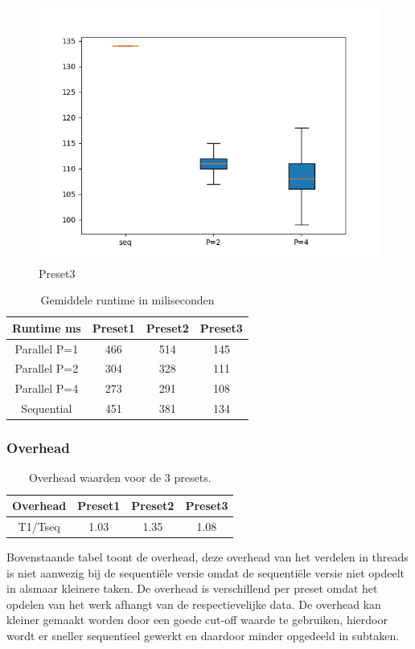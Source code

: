 \documentclass[]{article}
\begin{document}
\begin{figure}
	\centering
	\includegraphics[width=0.7\linewidth]{Preset_3}
	\caption[Preset1]{Preset3}
	\label{fig:preset3}
\end{figure}

\begin{table}[h!]
	\centering
	\begin{tabular}{|c|c|c|c|}
		\hline 
		Runtime ms & Preset1 & Preset2 & Preset3 \\ 
		\hline 
		Parallel P=1 & 466 & 514 & 145 \\ 
		\hline 
		Parallel P=2 & 304 & 328 & 111 \\ 
		\hline 
		Parallel P=4 & 273 & 291 & 108 \\ 
		\hline 
		Sequential & 451 & 381 & 134 \\ 
		\hline 
	\end{tabular}
	\caption{Gemiddele runtime in miliseconden}
	\label{table:1}
\end{table}

\subsubsection{Overhead}

\begin{table}[h!]
	\centering
\begin{tabular}{|c|c|c|c|}
	\hline 
	Overhead & Preset1 & Preset2 & Preset3 \\ 
	\hline 
	T1/Tseq & 1.03 & 1.35 & 1.08 \\ 
	\hline 
\end{tabular} 
\caption{Overhead waarden voor de 3 presets.}
\label{table:2}
\end{table}

Bovenstaande tabel toont de overhead, deze overhead van het verdelen in threads is niet aanwezig bij de sequentiële versie omdat de sequentiële versie niet opdeelt in alsmaar kleinere taken. De overhead is verschillend per preset omdat het opdelen van het werk afhangt van de respectievelijke data.
De overhead kan kleiner gemaakt worden door een goede cut-off waarde te gebruiken, hierdoor wordt er sneller sequentieel gewerkt en daardoor minder opgedeeld in subtaken.
\end{document}
